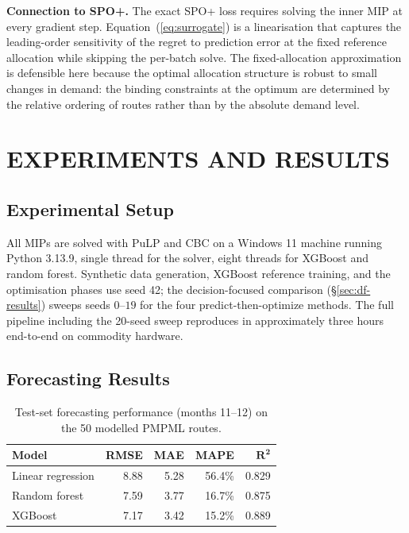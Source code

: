 \documentclass[a4paper,twoside]{article}
\begin{document}
\textbf{Connection to SPO+.} The exact SPO+ loss
\cite{elmachtoub2022smart} requires solving the inner MIP at every
gradient step. Equation~(\ref{eq:surrogate}) is a linearisation
that captures the leading-order sensitivity of the regret to
prediction error at the fixed reference allocation while skipping
the per-batch solve. The fixed-allocation approximation is
defensible here because the optimal allocation structure is
robust to small changes in demand: the binding constraints at the
optimum are determined by the relative ordering of routes rather
than by the absolute demand level.

\section{\uppercase{Experiments and Results}}
\label{sec:results}

\subsection{Experimental Setup}

All MIPs are solved with PuLP \cite{pulp} and CBC on a Windows 11
machine running Python 3.13.9, single thread for the solver,
eight threads for XGBoost and random forest. Synthetic data
generation, XGBoost reference training, and the optimisation
phases use seed 42; the decision-focused comparison
(\S\ref{sec:df-results}) sweeps seeds $0$--$19$ for the four
predict-then-optimize methods. The full pipeline including the
20-seed sweep reproduces in approximately three hours end-to-end
on commodity hardware.

\subsection{Forecasting Results}
\label{sec:forecast-results}

\begin{table}[h]
\caption{Test-set forecasting performance (months 11--12) on the
50 modelled PMPML routes.}
\label{tab:forecast}
\centering\scriptsize
\begin{tabular}{@{}lrrrr@{}}
\toprule
\textbf{Model} & \textbf{RMSE} & \textbf{MAE} & \textbf{MAPE} &
$\mathbf{R^2}$ \\
\midrule
Linear regression &  8.88 & 5.28 & 56.4\% & 0.829 \\
Random forest     &  7.59 & 3.77 & 16.7\% & 0.875 \\
XGBoost           &  7.17 & 3.42 & 15.2\% & 0.889 \\
\bottomrule
\end{tabular}
\end{table}
\end{document}
